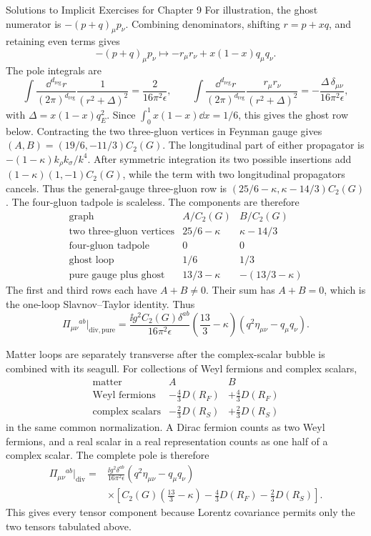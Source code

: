 \begin{bankssolutions}{Solutions to Implicit Exercises for Chapter 9}
For illustration, the ghost numerator is
$-(p+q)_\mu p_\nu$.  Combining denominators, shifting
$r=p+xq$, and retaining even terms gives
\[
  -(p+q)_\mu p_\nu
  \longmapsto-r_\mu r_\nu+x(1-x)q_\mu q_\nu.
\]
The pole integrals are
\[
  \int\frac{\dd^{d_{\mathrm{reg}}}r}{(2\pi)^{d_{\mathrm{reg}}}}
  \frac1{(r^2+\Delta)^2}
  =\frac{2}{16\pi^2\epsilon},\qquad
  \int\frac{\dd^{d_{\mathrm{reg}}}r}{(2\pi)^{d_{\mathrm{reg}}}}
  \frac{r_\mu r_\nu}{(r^2+\Delta)^2}
  =-\frac{\Delta\,\delta_{\mu\nu}}{16\pi^2\epsilon},
\]
with $\Delta=x(1-x)q_E^2$.  Since
$\int_0^1x(1-x)\dd x=1/6$, this gives the ghost row below.  Contracting the
two three-gluon vertices in Feynman gauge gives
$(A,B)=(19/6,-11/3)C_2(G)$.  The longitudinal part of either propagator is
  $-(1-\kappa)k_\rho k_\sigma/k^4$.  After symmetric integration its two possible
insertions add $(1-\kappa)(1,-1)C_2(G)$, while the term with two longitudinal
propagators cancels.  Thus the general-gauge three-gluon row is
$(25/6-\kappa,\kappa-14/3)C_2(G)$.  The four-gluon tadpole is scaleless.  The
components are therefore
\[
\begin{array}{c|cc}
  \text{graph}&A/C_2(G)&B/C_2(G)\\ \hline
  \text{two three-gluon vertices}&25/6-\kappa&\kappa-14/3\\
  \text{four-gluon tadpole}&0&0\\
  \text{ghost loop}&1/6&1/3\\ \hline
  \text{pure gauge plus ghost}&13/3-\kappa&-(13/3-\kappa)
\end{array}
\]
The first and third rows each have
$A+B\ne0$.  Their sum has $A+B=0$, which is the one-loop Slavnov--Taylor
identity.  Thus
\[
  \Pi_{\mu\nu}{}^{ab}\big|_{\mathrm{div,pure}}
  =\frac{\ii g^2C_2(G)\delta^{ab}}{16\pi^2\epsilon}
  \left(\frac{13}{3}-\kappa\right)
  (q^2\eta_{\mu\nu}-q_\mu q_\nu).
\]

Matter loops are separately transverse after the complex-scalar bubble is
combined with its seagull.  For collections of Weyl fermions and complex
scalars,
\[
\begin{array}{c|cc}
  \text{matter}&A&B\\ \hline
  \text{Weyl fermions}&-\frac43D(R_F)&+\frac43D(R_F)\\
  \text{complex scalars}&-\frac23D(R_S)&+\frac23D(R_S)
\end{array}
\]
in the same common normalization.  A Dirac fermion counts as two Weyl
fermions, and a real scalar in a real representation counts as one half of a
complex scalar.  The complete pole is therefore
\[
\begin{aligned}
  \Pi_{\mu\nu}{}^{ab}\big|_{\mathrm{div}}
  ={}&\frac{\ii g^2\delta^{ab}}{16\pi^2\epsilon}
  (q^2\eta_{\mu\nu}-q_\mu q_\nu)\\
  &\times\left[
  C_2(G)\left(\frac{13}{3}-\kappa\right)
  -\frac43D(R_F)-\frac23D(R_S)\right].
\end{aligned}
\]
This gives every tensor component because Lorentz covariance permits only the
two tensors tabulated above.


\end{bankssolutions}
